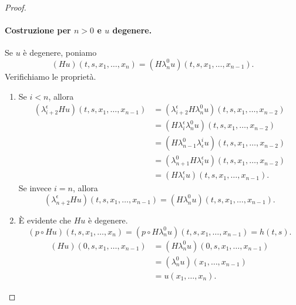 \begin{proof}
\paragraph{Costruzione per $n>0$ e $u$ degenere.}
Se $u$ è degenere, poniamo
$$
(Hu)(t,s,x_1,\ldots,x_n)=(H\lambda^0_nu)(t,s,x_1,\ldots,x_{n-1}).
$$
Verifichiamo le proprietà.
\begin{enumerate}
\eqitem
\begin{align*}
(\lambda^\epsilon_2Hu)(t,x_1,\ldots,x_n)&=(\lambda^\epsilon_2H\lambda^0_nu)(t,x_1,\ldots,x_{n-1})\\
&=(T_\epsilon\lambda^0_nu)(t,x_1,\ldots,x_{n-1})\\
&=(\lambda^0_{n+1}T_\epsilon u)(t,x_1,\ldots,x_{n-1})\\
&=T_\epsilon u(t,x_1,\ldots,x_{n-1},x_n).
\end{align*}
\item Se $i<n$, allora
\begin{align*}
(\lambda^\epsilon_{i+2}Hu)(t,s,x_1,\ldots,x_{n-1})&=(\lambda^\epsilon_{i+2}H\lambda^0_nu)(t,s,x_1,\ldots,x_{n-2})\\
&=(H\lambda^\epsilon_i\lambda^0_nu)(t,s,x_1,\ldots,x_{n-2})\\
&=(H\lambda^0_{n-1}\lambda^i_\epsilon u)(t,s,x_1,\ldots,x_{n-2})\\
&=(\lambda^0_{n+1}H\lambda^\epsilon_iu)(t,s,x_1,\ldots,x_{n-2})\\
&=(H\lambda^\epsilon_iu)(t,s,x_1,\ldots,x_{n-1}).
\end{align*}
Se invece $i=n$, allora
$$
(\lambda^\epsilon_{n+2}Hu)(t,s,x_1,\ldots,x_{n-1})=(H\lambda^0_nu)(t,s,x_1,\ldots,x_{n-1}).
$$
\item È evidente che $Hu$ è degenere.
\eqitem
$$
(p\circ Hu)(t,s,x_1,\ldots,x_n)=(p\circ H\lambda^0_nu)(t,s,x_1,\ldots,x_{n-1})=h(t,s).
$$
\eqitem
\begin{align*}
(Hu)(0,s,x_1,\ldots,x_{n-1})&=(H\lambda^0_nu)(0,s,x_1,\ldots,x_{n-1})\\
&=(\lambda^0_nu)(x_1,\ldots,x_{n-1})\\
&=u(x_1,\ldots,x_n).
\end{align*}
\end{enumerate}

\end{proof}
